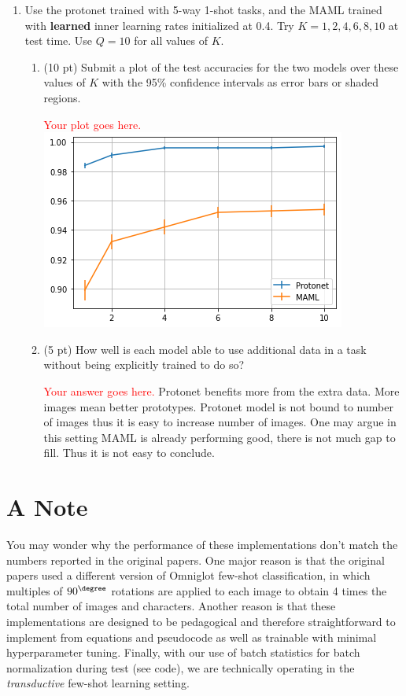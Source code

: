 \documentclass[12pt]{article}
\begin{document}
\begin{enumerate}
    \item Use the protonet trained with 5-way 1-shot tasks, and the MAML trained with \textbf{learned} inner learning rates initialized at 0.4. Try $K = 1, 2, 4, 6, 8, 10$ at test time. Use $Q = 10$ for all values of $K$. 
    \begin{enumerate}
        \item (10 pt) Submit a plot of the test accuracies for the two models over these values of $K$ with the 95\% confidence intervals as error bars or shaded regions. 

        \textcolor{red}{Your plot goes here.}
        \break
        \includegraphics[width=1.0\linewidth]{figures/part3}
        
        \item (5 pt) How well is each model able to use additional data in a task without being explicitly trained to do so?

        \textcolor{red}{Your answer goes here.}
        \break Protonet benefits more from the extra data. More images mean better prototypes. Protonet model is not bound to number of images thus it is easy to increase number of images.
        \break One may argue in this setting MAML is already performing good, there is not much gap to fill. Thus it is not easy to conclude.
    \end{enumerate}
\end{enumerate}

\newpage
\section*{A Note}
You may wonder why the performance of these implementations don't match the numbers reported in the original papers. One major reason is that the original papers used a different version of Omniglot few-shot classification, in which multiples of $90^{\degree}$ rotations are applied to each image to obtain 4 times the total number of images and characters. Another reason is that these implementations are designed to be pedagogical and therefore straightforward to implement from equations and pseudocode as well as trainable with minimal hyperparameter tuning. Finally, with our use of batch statistics for batch normalization during test (see code), we are technically operating in the \emph{transductive} few-shot learning setting.

\newpage


\end{document}
